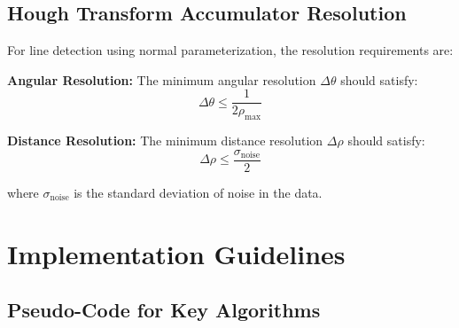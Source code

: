 \documentclass[12pt]{article}
\begin{document}
\subsection{Hough Transform Accumulator Resolution}
\label{app:hough_resolution}

For line detection using normal parameterization, the resolution requirements are:

\textbf{Angular Resolution:} The minimum angular resolution $\Delta\theta$ should satisfy:
\begin{equation}
    \Delta\theta \leq \frac{1}{2\rho_{\max}}
    \label{eq:angular_resolution}
\end{equation}

\textbf{Distance Resolution:} The minimum distance resolution $\Delta\rho$ should satisfy:
\begin{equation}
    \Delta\rho \leq \frac{\sigma_{\text{noise}}}{2}
    \label{eq:distance_resolution}
\end{equation}

where $\sigma_{\text{noise}}$ is the standard deviation of noise in the data.

\section{Implementation Guidelines}
\label{app:implementation}

\subsection{Pseudo-Code for Key Algorithms}
\label{app:pseudocode}
\end{document}
